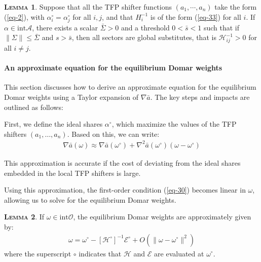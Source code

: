 \documentclass[11pt]{article}
\theoremstyle{definition}
\newtheorem{lemma}{\noindent \textbf{\textsc{Lemma}}}
\begin{document}
	\begin{lemma}
		Suppose that all the TFP shifter functions $(a_1, \cdots ,a_n)$ take the form (\ref{eq-2}), with $\alpha_i^{\circ} = \alpha_j^{\circ}$ for all $i, j$, and that $H_i^{-1}$ is of the form (\ref{eq-33}) for all $i$. If $\alpha\in\text{int}\mathcal{A}$, there exists a scalar $\bar{\Sigma} > 0$ and a threshold $0 < \bar{s} < 1$ such that if $\|\Sigma\| \leqslant \bar{\Sigma}$ and $s > \bar{s}$, then all sectors are global substitutes, that is $\mathcal{H}_{ij}^{-1} > 0$ for all $i\neq j$.
	\end{lemma}
	
	\paragraph{An approximate equation for the equilibrium Domar weights}
	This section discusses how to derive an approximate equation for the equilibrium Domar weights using a Taylor expansion of \(\nabla\bar{a}\). The key steps and impacts are outlined as follows:
	
	First, we define the ideal shares \( \alpha^\circ \), which maximize the values of the TFP shifters \( (a_1, \dots, a_n) \). Based on this, we can write:
	\begin{align}
		\nabla \bar{a} (\omega) \approx \nabla \bar{a} (\omega^\circ) + \nabla^2 \bar{a} (\omega^\circ) (\omega - \omega^\circ) \label{eq-34}
	\end{align}
	
	This approximation is accurate if the cost of deviating from the ideal shares embedded in the local TFP shifters is large.
	
	Using this approximation, the first-order condition (\ref{eq-30}) becomes linear in \( \omega \), allowing us to solve for the equilibrium Domar weights.
	
	\begin{lemma}
		If \( \omega \in\text{int}\mathcal{O} \), the equilibrium Domar weights are approximately given by:
		\begin{align}
			\omega = \omega^\circ - [\mathcal{H}^\circ]^{-1} \mathcal{E}^\circ + O\left(\|\omega - \omega^\circ\|^2\right) \label{eq-35}
		\end{align}
		where the superscript \( \circ \) indicates that \( \mathcal{H} \) and \( \mathcal{E} \) are evaluated at \( \omega^\circ \).
	\end{lemma}
	
\end{document}
